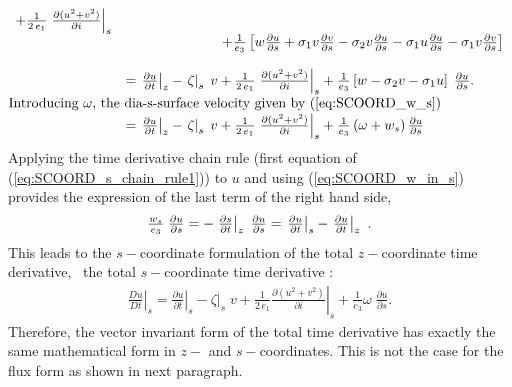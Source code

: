 \documentclass[../main/NEMO_manual]{subfiles}
\begin{document}
\begin{subequations}
\begin{align*}
{\begin{array}{*{20}l}
        + \frac{1}{2\,e_1}\left. {\frac{\partial (u^2+v^2)}{\partial i}} \right|_s \\
      &\qquad \qquad \qquad \quad
        + \frac{1}{e_3} \left[    {w\frac{\partial u}{\partial s}
        +\sigma_1 v\frac{\partial v}{\partial s} - \sigma_2 v\frac{\partial u}{\partial s}
        - \sigma_1 u\frac{\partial u}{\partial s} - \sigma_1 v\frac{\partial v}{\partial s}} \right] \\ \\
      &= \left. {\frac{\partial u }{\partial t}} \right|_z
        - \left. \zeta \right|_s \;v
        + \frac{1}{2\,e_1}\left. {\frac{\partial (u^2+v^2)}{\partial i}} \right|_s
        + \frac{1}{e_3} \left[  w - \sigma_2 v - \sigma_1 u  \right]
        \; \frac{\partial u}{\partial s} .  \\
      \intertext{Introducing $\omega$, the dia-s-surface velocity given by (\autoref{eq:SCOORD_w_s}) }
      &= \left. {\frac{\partial u }{\partial t}} \right|_z
        - \left. \zeta \right|_s \;v
        + \frac{1}{2\,e_1}\left. {\frac{\partial (u^2+v^2)}{\partial i}} \right|_s
        + \frac{1}{e_3 } \left( \omega + w_s \right) \frac{\partial u}{\partial s}   \\
    \end{array}
    }
  \end{align*}
\end{subequations}
Applying the time derivative chain rule (first equation of (\autoref{eq:SCOORD_s_chain_rule1})) to $u$ and
using (\autoref{eq:SCOORD_w_in_s}) provides the expression of the last term of the right hand side,
\[
  {
    \begin{array}{*{20}l}
      \frac{w_s}{e_3}  \;\frac{\partial u}{\partial s}
      = - \left. \frac{\partial s}{\partial t} \right|_z \;  \frac{\partial u }{\partial s}
      = \left. {\frac{\partial u }{\partial t}} \right|_s  - \left. {\frac{\partial u }{\partial t}} \right|_z \ .
    \end{array}
  }
\]
This leads to the $s-$coordinate formulation of the total $z-$coordinate time derivative,
\ie\ the total $s-$coordinate time derivative :
\begin{align}
  \label{eq:SCOORD_sco_Dt_vect}
  \left. \frac{D u}{D t} \right|_s
  = \left. {\frac{\partial u }{\partial t}} \right|_s
  - \left. \zeta \right|_s \;v
  + \frac{1}{2\,e_1}\left. {\frac{\partial (u^2+v^2)}{\partial i}} \right|_s
  + \frac{1}{e_3 } \omega \;\frac{\partial u}{\partial s} .
\end{align}
Therefore, the vector invariant form of the total time derivative has exactly the same mathematical form in
$z-$ and $s-$coordinates.
This is not the case for the flux form as shown in next paragraph.
\end{document}
